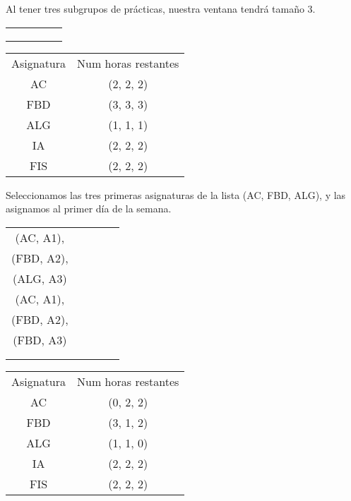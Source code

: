 Al tener tres subgrupos de prácticas, nuestra ventana tendrá tamaño 3. 

\begin{minipage}{0.5\textwidth}    
\begin{tabular}{| c | c | c | c | c |}
\hline
 &  &  &  & \\
 \hline
 &  &  &  & \\
 \hline
 &  &  &  & \\
 \hline
 &  &  &  & \\
 \hline 
\end{tabular}
\end{minipage}
\begin{minipage}{0.5\textwidth}
\begin{tabular}{c | c}
Asignatura & Num horas restantes \\
AC & (2, 2, 2) \\
FBD & (3, 3, 3) \\
ALG & (1, 1, 1) \\
IA & (2, 2, 2) \\
FIS & (2, 2, 2)
\end{tabular}
\end{minipage}

Seleccionamos las tres primeras asignaturas de la lista (AC, FBD, ALG), y las asignamos al primer día de la semana.

\begin{minipage}{0.5\textwidth}    
\begin{tabular}{| c | c | c | c | c |}
\hline
 (AC, A1), &  &  &  & \\
 (FBD, A2), &  &  &  & \\
 (ALG, A3) &  &  &  & \\
 \hline
 (AC, A1), &  &  &  & \\
 (FBD, A2), &  &  &  & \\
 (FBD, A3) &  &  &  & \\
 \hline
 &  &  &  & \\
 \hline
 &  &  &  & \\
 \hline 
\end{tabular}
\end{minipage}
\begin{minipage}{0.5\textwidth}
\begin{tabular}{c | c}
Asignatura & Num horas restantes \\
AC & (0, 2, 2) \\
FBD & (3, 1, 2) \\
ALG & (1, 1, 0) \\
IA & (2, 2, 2) \\
FIS & (2, 2, 2)
\end{tabular}
\end{minipage}

